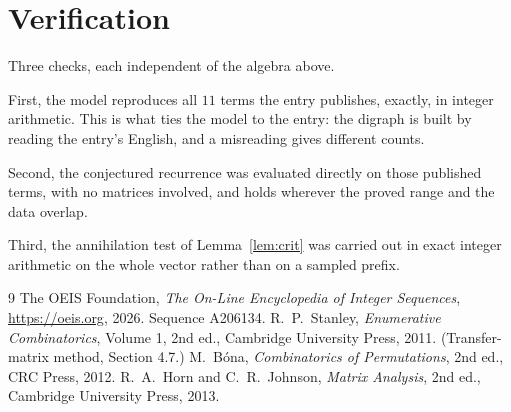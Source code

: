 \documentclass[11pt,a4paper]{article}
\theoremstyle{plain}
\theoremstyle{definition}
\begin{document}
\section{Verification}

Three checks, each independent of the algebra above.

First, the model reproduces all $11$ terms the entry publishes, exactly, in integer
arithmetic. This is what ties the model to the entry: the digraph is built by reading the
entry's English, and a misreading gives different counts.

Second, the conjectured recurrence was evaluated directly on those published terms, with no
matrices involved, and holds wherever the proved range and the data overlap.

Third, the annihilation test of Lemma~\ref{lem:crit} was carried out in exact integer
arithmetic on the whole vector rather than on a sampled prefix.

\begin{thebibliography}{9}
 The OEIS Foundation, \emph{The On-Line Encyclopedia of Integer
Sequences}, \url{https://oeis.org}, 2026. Sequence A206134.
 R.~P.~Stanley, \emph{Enumerative Combinatorics}, Volume 1, 2nd ed.,
Cambridge University Press, 2011. (Transfer-matrix method, Section 4.7.)
 M.~B\'ona, \emph{Combinatorics of Permutations}, 2nd ed., CRC
Press, 2012.
 R.~A.~Horn and C.~R.~Johnson, \emph{Matrix Analysis}, 2nd ed., Cambridge
University Press, 2013.
\end{thebibliography}
\end{document}
